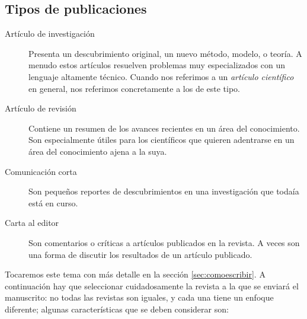 \subsection*{Tipos de publicaciones}

\begin{description}
    \item[Artículo de investigación] Presenta un descubrimiento original, un
        nuevo método, modelo, o teoría.
        A menudo estos artículos resuelven problemas muy especializados con un
        lenguaje altamente técnico.
        Cuando nos referimos a un \emph{artículo científico} en general, nos
        referimos concretamente a los de este tipo.
    \item[Artículo de revisión] Contiene un resumen de los avances recientes en
        un área del conocimiento.
        Son especialmente útiles para los científicos que quieren adentrarse en
        un área del conocimiento ajena a la suya.
    \item[Comunicación corta] Son pequeños reportes de descubrimientos en una
        investigación que todaía está en curso.
    \item[Carta al editor] Son comentarios o críticas a artículos publicados en
        la revista.
        A veces son una forma de discutir los resultados de un artículo
        publicado.
\end{description}

Tocaremos este tema con más detalle en la sección \ref{sec:comoescribir}.
A continuación hay que seleccionar cuidadosamente la revista a la que se enviará
el manuscrito: no todas las revistas son iguales, y cada una tiene un enfoque
diferente; algunas características que se deben considerar son:

